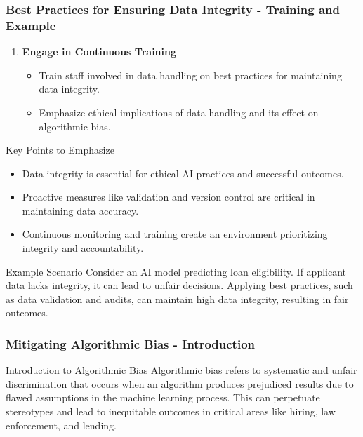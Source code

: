 \documentclass{beamer}
\begin{document}
\begin{frame}[fragile]
    \frametitle{Best Practices for Ensuring Data Integrity - Training and Example}
    \begin{enumerate}[resume]
        \item \textbf{Engage in Continuous Training}
        \begin{itemize}
            \item Train staff involved in data handling on best practices for maintaining data integrity.
            \item Emphasize ethical implications of data handling and its effect on algorithmic bias.
        \end{itemize}
    \end{enumerate}

    \begin{block}{Key Points to Emphasize}
        \begin{itemize}
            \item Data integrity is essential for ethical AI practices and successful outcomes.
            \item Proactive measures like validation and version control are critical in maintaining data accuracy.
            \item Continuous monitoring and training create an environment prioritizing integrity and accountability.
        \end{itemize}
    \end{block}
    
    \begin{block}{Example Scenario}
        Consider an AI model predicting loan eligibility. If applicant data lacks integrity, it can lead to unfair decisions. Applying best practices, such as data validation and audits, can maintain high data integrity, resulting in fair outcomes.
    \end{block}
\end{frame}

\begin{frame}[fragile]
    \frametitle{Mitigating Algorithmic Bias - Introduction}
    \begin{block}{Introduction to Algorithmic Bias}
        Algorithmic bias refers to systematic and unfair discrimination that occurs when an algorithm produces prejudiced results due to flawed assumptions in the machine learning process. 
        This can perpetuate stereotypes and lead to inequitable outcomes in critical areas like hiring, law enforcement, and lending.
    \end{block}
\end{frame}
\end{document}

